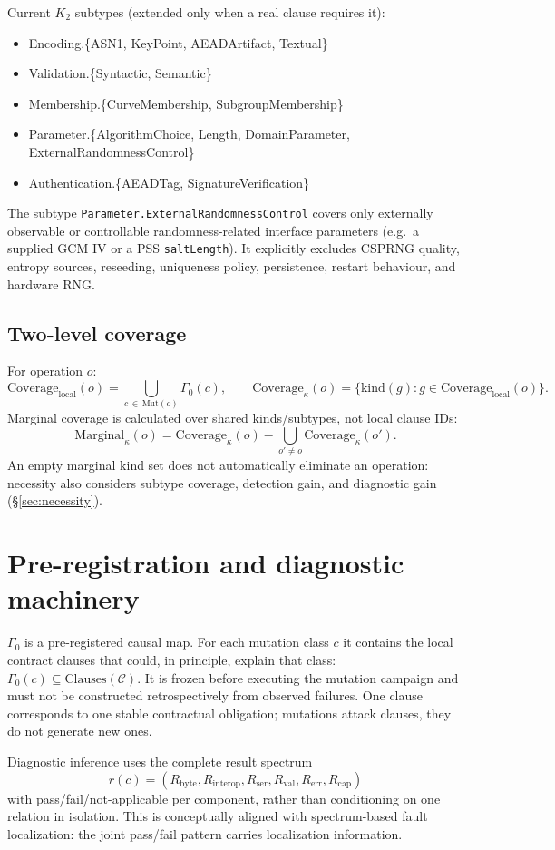 \documentclass[11pt,a4paper]{article}
\begin{document}
Current $K_2$ subtypes (extended only when a real clause requires it):
\begin{itemize}
\item Encoding.\{ASN1, KeyPoint, AEADArtifact, Textual\}
\item Validation.\{Syntactic, Semantic\}
\item Membership.\{CurveMembership, SubgroupMembership\}
\item Parameter.\{AlgorithmChoice, Length, DomainParameter, ExternalRandomnessControl\}
\item Authentication.\{AEADTag, SignatureVerification\}
\end{itemize}
The subtype \texttt{Parameter.ExternalRandomnessControl} covers only externally observable or controllable randomness-related interface parameters (e.g.\ a supplied GCM IV or a PSS \texttt{saltLength}). It explicitly excludes CSPRNG quality, entropy sources, reseeding, uniqueness policy, persistence, restart behaviour, and hardware RNG.

\subsection{Two-level coverage}
For operation $o$:
\[\text{Coverage}_{\text{local}}(o) = \bigcup_{c\,\in\,\text{Mut}(o)} \Gamma_0(c), \qquad \text{Coverage}_{\kappa}(o) = \{\text{kind}(g) : g \in \text{Coverage}_{\text{local}}(o)\}.\]
Marginal coverage is calculated over shared kinds/subtypes, not local clause IDs:
\[\text{Marginal}_{\kappa}(o) = \text{Coverage}_{\kappa}(o) - \bigcup_{o'\neq o}\text{Coverage}_{\kappa}(o').\]
An empty marginal kind set does not automatically eliminate an operation: necessity also considers subtype coverage, detection gain, and diagnostic gain (\S\ref{sec:necessity}).

\section{Pre-registration and diagnostic machinery}
$\Gamma_0$ is a pre-registered causal map. For each mutation class $c$ it contains the local contract clauses that could, in principle, explain that class: $\Gamma_0(c)\subseteq\text{Clauses}(\mathcal{C})$. It is frozen before executing the mutation campaign and must not be constructed retrospectively from observed failures. One clause corresponds to one stable contractual obligation; mutations attack clauses, they do not generate new ones.

Diagnostic inference uses the complete result spectrum
\[r(c) = (R_{\text{byte}}, R_{\text{interop}}, R_{\text{ser}}, R_{\text{val}}, R_{\text{err}}, R_{\text{cap}})\]
with pass/fail/not-applicable per component, rather than conditioning on one relation in isolation. This is conceptually aligned with spectrum-based fault localization: the joint pass/fail pattern carries localization information.
\end{document}

